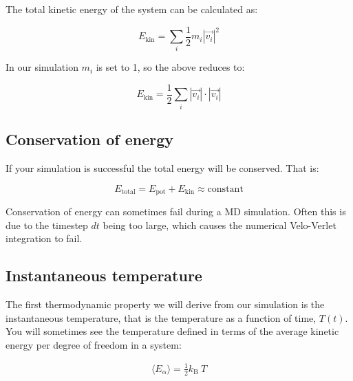 \documentclass{article}
\begin{document}
The total kinetic energy of the system can be calculated as:

\begin{equation}
    E_{\mathrm{kin}} = \sum_i \frac{1}{2} m_i |\vec{v_i}|^2
\end{equation}

In our simulation $m_i$ is set to 1, so the above reduces to:

\begin{equation}
    E_{\mathrm{kin}} = \frac{1}{2} \sum_i |\vec{v_i}| \cdot |\vec{v_i}|
\end{equation}

% 
% 


\subsection{Conservation of energy}

If your simulation is successful the total energy will be conserved. That is:

\begin{equation}
    E_{\mathrm{total}} = E_{\mathrm{pot}} + E_{\mathrm{kin}} \approx \mathrm{constant}
\end{equation}

Conservation of energy can sometimes fail during a MD simulation.
Often this is due to the timestep $dt$ being too large, which causes the numerical Velo-Verlet integration to fail.


\subsection{Instantaneous temperature}

The first thermodynamic property we will derive from our simulation is the instantaneous temperature,
that is the temperature as a function of time, $T(t)$.
You will sometimes see the temperature defined in terms of the average kinetic energy per degree of freedom in a system:

\begin{eqnarray}
    \langle E_{\alpha} \rangle = \frac{1}{2} k_\mathrm{B} \ T
\end{eqnarray}
\end{document}
